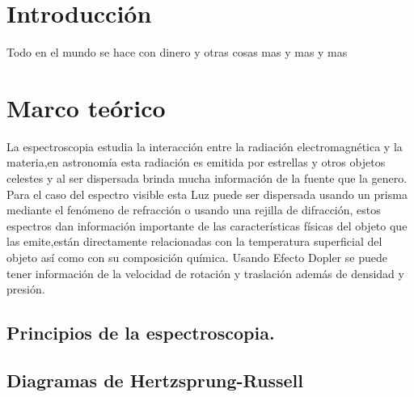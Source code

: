 \documentclass[11pt]{article}
\begin{document}
\section{Introducci\'on}

Todo en el mundo se hace con dinero y otras cosas mas y mas y mas












\section{Marco teórico}
La espectroscopia estudia la interacción entre la radiación electromagnética y la materia,en astronomía esta radiación es emitida por estrellas y otros objetos celestes y al ser dispersada brinda mucha información de la fuente que la genero.\\
Para el caso del espectro visible esta Luz puede ser dispersada usando un prisma mediante el fenómeno de refracción o usando una rejilla de difracción, estos espectros dan información importante de las características físicas del objeto que las emite,están directamente relacionadas con la temperatura superficial del objeto así como con su composición química. Usando Efecto Dopler se puede tener información de la velocidad de rotación y traslación además de densidad y presión.
\cite{moreira2009modelo}\\




\subsection {Principios de la espectroscopia.}



\subsection {Diagramas de Hertzsprung-Russell}
\end{document}
